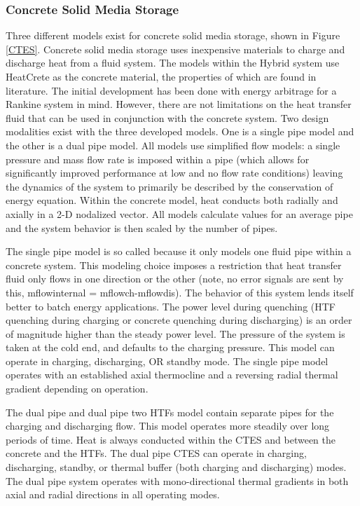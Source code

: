 \subsubsection{Concrete Solid Media Storage}

Three different models exist for concrete solid media storage, shown in Figure \ref{CTES}. Concrete solid media storage uses inexpensive materials to charge and discharge heat from a fluid system. The models within the Hybrid system use HeatCrete as the concrete material, the properties of which are found in literature. The initial development has been done with energy arbitrage for a Rankine system in mind. However, there are not limitations on the heat transfer fluid that can be used in conjunction with the concrete system. Two design modalities exist with the three developed models. One is a single pipe model and the other is a dual pipe model. All models use simplified flow models: a single pressure and mass flow rate is imposed within a pipe (which allows for significantly improved performance at low and no flow rate conditions) leaving the dynamics of the system to primarily be described by the conservation of energy equation. Within the concrete model, heat conducts both radially and axially in a 2-D nodalized vector. All models calculate values for an average pipe and the system behavior is then scaled by the number of pipes. 

The single pipe model is so called because it only models one fluid pipe within a concrete system. This modeling choice imposes a restriction that heat transfer fluid only flows in one direction or the other (note, no error signals are sent by this, m\textunderscore flow\textunderscore internal = m\textunderscore flow\textunderscore ch-m\textunderscore flow\textunderscore dis). The behavior of this system lends itself better to batch energy applications. The power level during quenching (HTF quenching during charging or concrete quenching during discharging) is an order of magnitude higher than the steady power level. The pressure of the system is taken at the cold end, and defaults to the charging pressure. This model can operate in charging, discharging, OR standby mode. The single pipe model operates with an established axial thermocline and a reversing radial thermal gradient depending on operation. 

The dual pipe and dual pipe two HTFs model contain separate pipes for the charging and discharging flow. This model operates more steadily over long periods of time. Heat is always conducted within the CTES and between the concrete and the HTFs. The dual pipe CTES can operate in charging, discharging, standby, or thermal buffer (both charging and discharging) modes. The dual pipe system operates with mono-directional thermal gradients in both axial and radial directions in all operating modes. 


